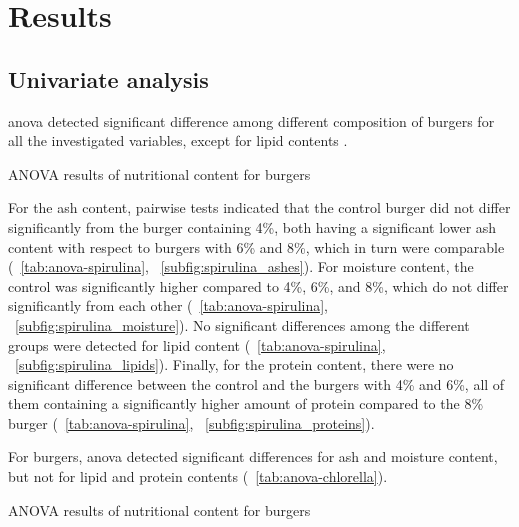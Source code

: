 
\section{Results}
\subsection{Univariate analysis}

\gls{anova} detected significant difference among different composition of  burgers for all the investigated variables, except for lipid contents .

\begin{table}[H]
	\centering
	\scriptsize
	
	\caption{ANOVA results of nutritional content for  burgers}
	\label{tab:anova-spirulina}
\end{table}

For the ash content, pairwise tests indicated that the control burger did not differ significantly from the burger containing 4\%, both having a significant lower ash content with respect to burgers with 6\% and 8\%, which in turn were comparable (\tab{}~\ref{tab:anova-spirulina}, \fig{}~\ref{subfig:spirulina_ashes}).
For moisture content, the control was significantly higher compared to 4\%, 6\%, and 8\%, which do not differ significantly from each other (\tab{}~\ref{tab:anova-spirulina}, \fig{}~\ref{subfig:spirulina_moisture}). No significant differences among the different groups were detected for lipid content (\tab{}~\ref{tab:anova-spirulina}, \fig{}~\ref{subfig:spirulina_lipids}). Finally, for the protein content, there were no significant difference between the control and the burgers with 4\% and 6\%, all of them containing a significantly higher amount of protein compared to the 8\% burger (\tab{}~\ref{tab:anova-spirulina}, \fig{}~\ref{subfig:spirulina_proteins}).




For  burgers, \gls{anova} detected significant differences for ash and moisture content, but not for lipid and protein contents (\tab{}~\ref{tab:anova-chlorella}).

\begin{table}[H]
	\centering
	\scriptsize
	
	\caption{ANOVA results of nutritional content for  burgers}
	\label{tab:anova-chlorella}
\end{table}

